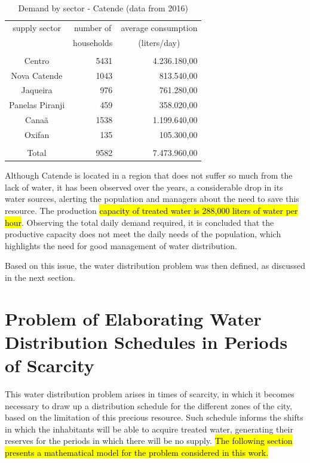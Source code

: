 \documentclass{singlecol}
\theoremstyle{TH}{
\newtheorem{lemma}{Lemma}
\newtheorem{theorem}[lemma]{Theorem}
\newtheorem{corrolary}[lemma]{Corrolary}
\newtheorem{conjecture}[lemma]{Conjecture}
\newtheorem{proposition}[lemma]{Proposition}
\newtheorem{claim}[lemma]{Claim}
\newtheorem{stheorem}[lemma]{Wrong Theorem}
\newtheorem{algorithm}{Algorithm}
}
\theoremstyle{THrm}{
\newtheorem{definition}{Definition}[section]
\newtheorem{question}{Question}[section]
\newtheorem{remark}{Remark}
\newtheorem{scheme}{Scheme}
}
\theoremstyle{THhit}{
\newtheorem{case}{Case}[section]
}
\begin{document}
\begin{table}[H]
\begin{center}
	\begin{tabular}{ c  r  r } 
		supply sector       &  \multicolumn{1}{c}{number of}     &   \multicolumn{1}{c}{average consumption}  \\
		                    &  \multicolumn{1}{c}{households}    &  \multicolumn{1}{c}{(liters/day)}   \\
		\\
		Centro              & 5431          &  4.236.180,00  \\
		Nova Catende        & 1043 			&    813.540,00  \\
		Jaqueira            &  976          &    761.280,00 \\
		Panelas Piranji     &  459          &    358.020,00 \\
		Canaã               & 1538          &  1.199.640,00 \\
		Oxifan              &  135          &    105.300,00 \\
		\\
		Total               & 9582          &  7.473.960,00 \\
		\hline
	\end{tabular}
\caption{Demand by sector - Catende (data from 2016)}
\label{tab:SectorsCatende}
\end{center}
\end{table}

Although Catende is located in a region that does not suffer so much from the lack of water, it has been observed over the years, a considerable drop in its water sources, alerting the population and managers about the need to save this resource. The production \label{secondChange}{\hl{capacity of treated water is 288,000 liters of water per hour}}. Observing the total daily demand required, it is concluded that the productive capacity does not meet the daily needs of the population, which highlights the need for good management of water distribution.

Based on this issue, the water distribution problem was then defined, as discussed in the next section. 

\section{Problem of Elaborating Water Distribution Schedules in Periods of Scarcity} 
\label{sec:EWDSPSP}

This water distribution problem arises in times of scarcity, in which it becomes necessary to draw up a distribution schedule for the different zones of the city, based on the limitation of this precious resource. Such schedule informs the shifts in which the inhabitants will be able to acquire treated water, generating their reserves for the periods in which there will be no supply. \hl{The following section presents a mathematical model for the problem considered in this work. }
\end{document}
